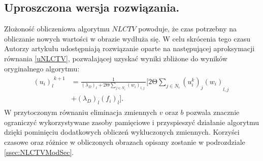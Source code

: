 \documentclass[a4paper,12pt,twoside,openany]{report}
\begin{document}
\subsection{Uproszczona wersja rozwiązania.}
Złożoność obliczeniowa algorytmu $NLCTV$ powoduje, że czas potrzebny na obliczanie nowych wartości w obrazie wydłuża się. W celu skrócenia tego czasu Autorzy artykułu \cite{ColorTextureInpaintingNLCTVModel} udostępniają rozwiązanie oparte na następującej aproksymacji równania \eqref{uNLCTV}, pozwalającej uzyskać wyniki zbliżone do wyników oryginalnego algorytmu:
\begin{align}
\begin{aligned}
{{\left(u_i\right)}_l}^{k+1} &= \frac{1}{{\left({\lambda }_D\right)}_l+2\mathrm{\Theta} \sum\limits_{j\in N_i} {\left(w_i\right)}_{l,j}\ } \Biggl[2\mathrm{\Theta }\sum_{j\in N_i} {{{\left(u^k_i\right)}_j\left(w_i\right)}_{l,j}\ }\\
&+ {\left({\lambda }_D\right)}_l{\left(f_i\right)}_l\Biggr].
\end{aligned}
\label{NLH1}
\end{align}
W przytoczonym równaniu eliminacja zmiennych $v$ oraz $b$ pozwala znacznie ograniczyć wykorzystywane zasoby pamięciowe i przyspieszyć działanie algorytmu dzięki pominięciu dodatkowych obliczeń wykluczonych zmiennych. Korzyści czasowe oraz różnice w obliczonych obrazach opisany zostanie w podrozdziale \ref{ssec:NLCTVModSec}.
\end{document}
